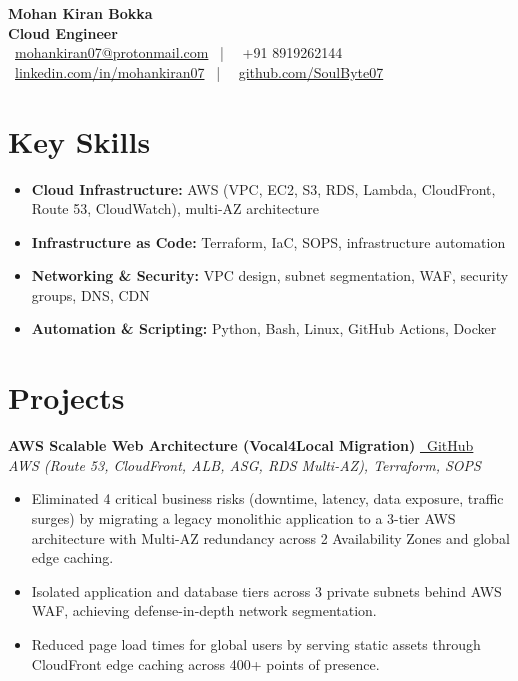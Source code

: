 \documentclass[10pt, letterpaper]{article}
\begin{document}
\pagestyle{empty}

\begin{center}
    {\LARGE \textbf{Mohan Kiran Bokka}} \\
    \vspace{2pt}
    {\large \textbf{Cloud Engineer}} \\
    \faEnvelope\ \href{mailto:mohankiran07@protonmail.com}{mohankiran07@protonmail.com} \ | \ \faPhone\ +91 8919262144 \\
    \faLinkedin\ \href{https://linkedin.com/in/mohankiran07}{linkedin.com/in/mohankiran07} \ | \ \faGithub\ \href{https://github.com/SoulByte07}{github.com/SoulByte07}
\end{center}

\section{Key Skills}
\begin{itemize}
    \item \textbf{Cloud Infrastructure:} AWS (VPC, EC2, S3, RDS, Lambda, CloudFront, Route 53, CloudWatch), multi-AZ architecture
    \item \textbf{Infrastructure as Code:} Terraform, IaC, SOPS, infrastructure automation
    \item \textbf{Networking \& Security:} VPC design, subnet segmentation, WAF, security groups, DNS, CDN
    \item \textbf{Automation \& Scripting:} Python, Bash, Linux, GitHub Actions, Docker
\end{itemize}

\section{Projects}

\noindent \textbf{AWS Scalable Web Architecture (Vocal4Local Migration)} \href{https://github.com/SoulByte07/AWS-Scalable-Web-Architecture}{\faGithub\ GitHub} \\
\textit{AWS (Route 53, CloudFront, ALB, ASG, RDS Multi-AZ), Terraform, SOPS}
\begin{itemize}
    \item Eliminated 4 critical business risks (downtime, latency, data exposure, traffic surges) by migrating a legacy monolithic application to a 3-tier AWS architecture with Multi-AZ redundancy across 2 Availability Zones and global edge caching.
    \item Isolated application and database tiers across 3 private subnets behind AWS WAF, achieving defense-in-depth network segmentation.
    \item Reduced page load times for global users by serving static assets through CloudFront edge caching across 400+ points of presence.
\end{itemize}
\end{document}
